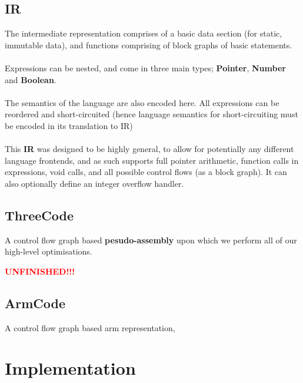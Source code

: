 \documentclass{article}
\newcommand{\keyword}[1]{\textbf{#1}}
\newcommand{\unfinished}{\begin{huge} \textcolor{red}{\textbf{UNFINISHED!!!}} \end{huge}}
\begin{document}
        \subsection*{IR}
            The intermediate representation comprises of a basic data section (for static, immutable data),
            and functions comprising of block graphs of basic statements.
            \\
            \\ Expressions can be nested, and come in three main types; \keyword{Pointer}, \keyword{Number} 
            and \keyword{Boolean}.
            \\
            \\ The semantics of the language are also encoded here. All expressions can be reordered and 
            short-circuited (hence language semantics for short-circuiting must be encoded in its translation to IR)
            \\
            \\ This \keyword{IR} was designed to be highly general, to allow for potentially any different 
            language frontends, and as such supports full pointer arithmetic, function calls in expressions, 
            void calls, and all possible control flows (as a block graph). It can also optionally define an 
            integer overflow handler.
        
        \subsection*{ThreeCode}
            A control flow graph based \keyword{pesudo-assembly} upon which we perform all of our high-level 
            optimisations.
            \unfinished
        
        \subsection*{ArmCode}
            A control flow graph based arm representation,

    \section*{Implementation}
\end{document}
